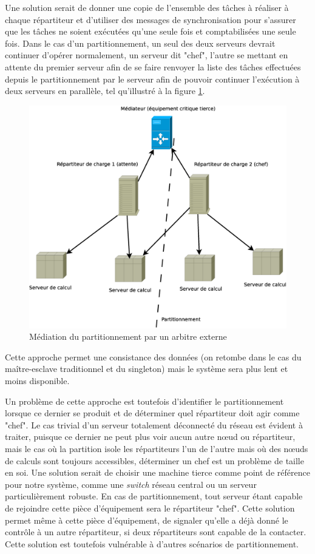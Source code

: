 Une solution serait de donner une copie de l'ensemble des tâches à réaliser à chaque répartiteur et d'utiliser des messages de synchronisation pour s'assurer que les 
tâches ne soient exécutées qu'une seule fois et comptabilisées une seule fois. Dans le cas d'un partitionnement, un seul des deux serveurs devrait continuer d'opérer normalement, 
un serveur dit "chef", l'autre se mettant en attente du premier serveur afin de se faire renvoyer la liste des tâches effectuées depuis le partitionnement par le serveur 
afin de pouvoir continuer l'exécution à deux serveurs en parallèle, tel qu'illustré à la figure \ref{fig:arch_2_chef}.

\begin{figure}
  \includegraphics[width=\linewidth]{Arch_2_part_mediator.eps}
  \caption{Médiation du partitionnement par un arbitre externe}
  \label{fig:arch_2_chef}
\end{figure}

Cette approche permet une consistance des données (on retombe dans le cas du maître-esclave traditionnel
et du singleton) mais le système sera plus lent et moins disponible. 

Un problème de cette approche est toutefois d'identifier le partitionnement lorsque ce dernier se produit et de déterminer quel répartiteur doit agir comme "chef". Le cas trivial d'un 
serveur totalement déconnecté du réseau est évident à traiter, puisque ce dernier ne peut plus voir aucun autre nœud ou répartiteur, mais le cas où la partition isole les répartiteurs 
l'un de l'autre mais où des nœuds de calculs sont toujours accessibles, déterminer un chef est un problème de taille en soi. Une solution serait de choisir une machine tierce comme point de 
référence pour notre système, comme une \emph{switch} réseau central ou un serveur particulièrement robuste. En cas de partitionnement, tout serveur étant capable de rejoindre cette pièce d'équipement 
sera le répartiteur "chef". Cette solution permet même à cette pièce d'équipement, de signaler qu'elle a déjà donné le contrôle à un autre répartiteur, si deux répartiteurs sont capable de la contacter. 
Cette solution est toutefois vulnérable à d'autres scénarios de partitionnement. 


